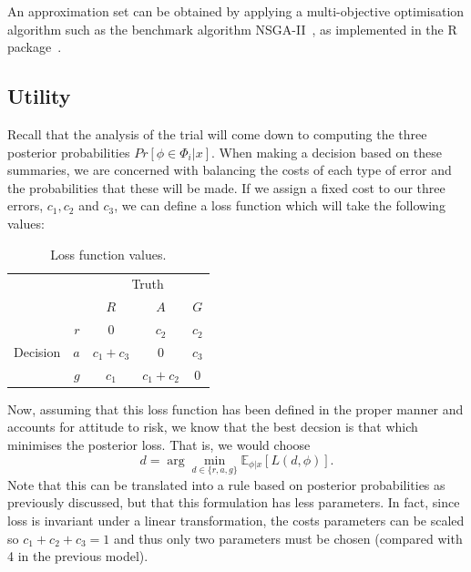 \documentclass{article} %
\begin{document}
An approximation set can be obtained by applying a multi-objective optimisation algorithm such as the benchmark algorithm NSGA-II~\cite{Deb2002}, as implemented in the R package~\cite{Mersmann2014}. 

\subsection{Utility}

Recall that the analysis of the trial will come down to computing the three posterior probabilities $Pr[\phi \in \Phi_{i} | x]$. When making a decision based on these summaries, we are concerned with balancing the costs of each type of error and the probabilities that these will be made. If we assign a fixed cost to our three errors, $c_{1}, c_{2}$ and $c_{3}$, we can define a loss function which will take the following values: 

\begin{table}
\centering
\begin{tabular}{r r c c c}
\toprule
& & \multicolumn{3}{c}{Truth} \\
& & $R$ & $A$ & $G$ \\
\midrule
\multirow{3}{*}{Decision} & $r$ & 0 & $c_{2}$ & $c_{2}$ \\
 & $a$ & $c_{1} + c_{3}$ & 0 & $c_{3}$ \\
 & $g$ & $c_{1}$ & $c_{1} + c_{2}$ & 0  \\
\bottomrule
\end{tabular}
\caption{Loss function values.}
\label{tab:probs}
\end{table}

Now, assuming that this loss function has been defined in the proper manner and accounts for attitude to risk, we know that the best decsion is that which minimises the posterior loss. That is, we would choose
\begin{equation}
d = \arg\min_{d \in \{r,a,g\}} \mathbb{E}_{\phi | x} [ L(d, \phi) ].
\end{equation}
Note that this can be translated into a rule based on posterior probabilities as previously discussed, but that this formulation has less parameters. In fact, since loss is invariant under a linear transformation, the costs parameters can be scaled so $c_{1} + c_{2} + c_{3} = 1$ and thus only two parameters must be chosen (compared with 4 in the previous model). 
\end{document}
